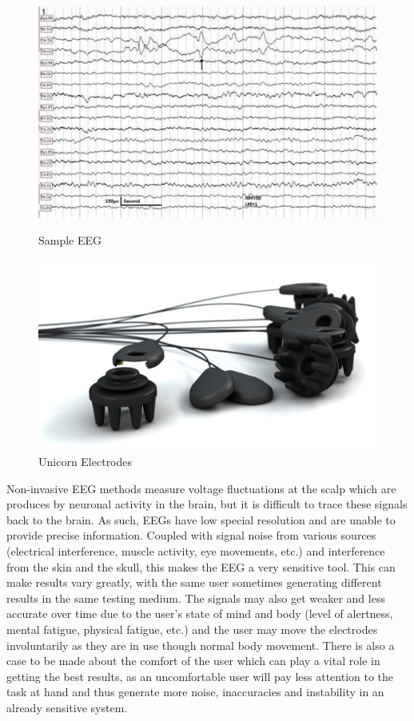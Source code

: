 \begin{figure}[H]
    \begin{minipage}[c]{0.45\linewidth}
      \includegraphics[width=\linewidth]{Graphics/EEG Example.jpeg}
      \caption{Sample EEG}
      \end{minipage}
    \hfill
    \begin{minipage}[c]{0.45\linewidth}
      \includegraphics[width=\linewidth]{Graphics/Unicorn Electrodes.jpg}
      \caption{Unicorn Electrodes}
  \end{minipage}%
\end{figure}

Non-invasive EEG methods measure voltage fluctuations at the scalp which are produces by neuronal activity in the brain, but it is difficult to trace these signals back to the brain. As such, EEGs have low special resolution and are unable to provide precise information. Coupled with signal noise from various sources (electrical interference, muscle activity, eye movements, etc.) and interference from the skin and the skull, this makes the EEG a very sensitive tool. This can make results vary greatly, with the same user sometimes generating different results in the same testing medium. The signals may also get weaker and less accurate over time due to the user's state of mind and body (level of alertness, mental fatigue, physical fatigue, etc.) and the user may move the electrodes involuntarily as they are in use though normal body movement. There is also a case to be made about the comfort of the user which can play a vital role in getting the best results, as an uncomfortable user will pay less attention to the task at hand and thus generate more noise, inaccuracies and instability in an already sensitive system.


